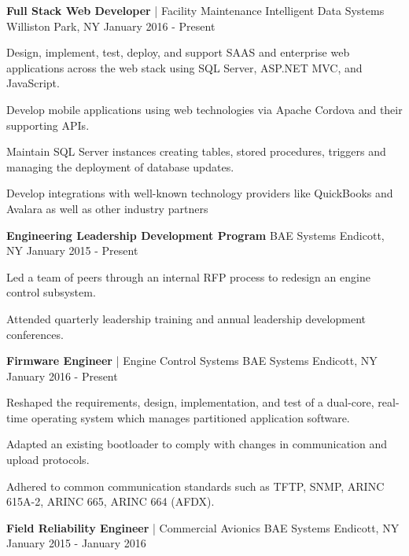 \begin{cventries}
  \cventry
    {\textbf{Full Stack Web Developer} | Facility Maintenance}
    {Intelligent Data Systems}
    {Williston Park, NY}
    {January 2016 - Present}
    {
      \begin{cvitems}
      	\item {Design, implement, test, deploy, and support SAAS and enterprise web applications across the web stack using SQL Server, ASP.NET MVC, and JavaScript.}
        \item {Develop mobile applications using web technologies via Apache Cordova and their supporting APIs.}
        \item{Maintain SQL Server instances creating tables, stored procedures, triggers and managing the deployment of database updates.}
        \item{Develop integrations with well-known technology providers like QuickBooks and Avalara as well as other industry partners}
      \end{cvitems}
    }
  \cventry
    {\textbf{Engineering Leadership Development Program}}
    {BAE Systems}
    {Endicott, NY}
    {January 2015 - Present}
    {
      \begin{cvitems}
      	\item {Led a team of peers through an internal RFP process to redesign an engine control subsystem.}
        \item {Attended quarterly leadership training and annual leadership development conferences.}
      \end{cvitems}
    }
  \cventrytwo
    {\textbf{Firmware Engineer} | Engine Control Systems}
    {BAE Systems}
    {Endicott, NY}
    {January 2016 - Present}
    {
      \begin{cvitemstwo}
        \item{Reshaped the requirements, design, implementation, and test of a dual-core, real-time operating system which manages partitioned application software.}
        \item{Adapted an existing bootloader to comply with changes in communication and upload protocols.}
        \item{Adhered to common communication standards such as TFTP, SNMP, ARINC 615A-2, ARINC 665, ARINC 664 (AFDX).}
      \end{cvitemstwo}
    }
  \cventrytwo
    {\textbf{Field Reliability Engineer} | Commercial Avionics}
    {BAE Systems}
    {Endicott, NY}
    {January 2015 - January 2016}
    {
      \begin{cvitemstwo}

\end{cvitemstwo}}
\end{cventries}
